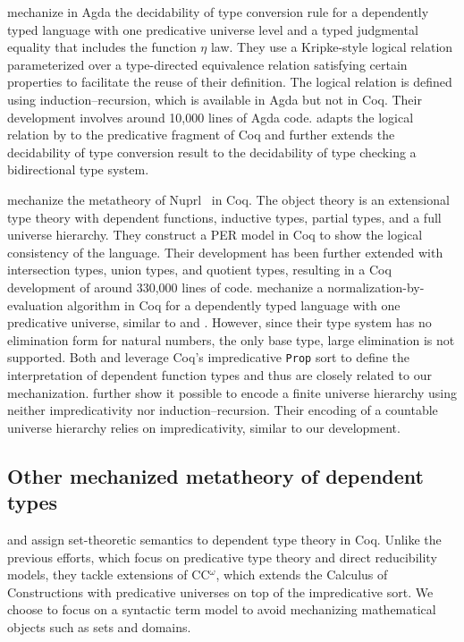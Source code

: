 \documentclass[\ifpublic nolinenum\else\fi,online,OA]{jfp}
\newcommand{\jc}[1]{}
\theoremstyle{definition}
\begin{document}
\citet{decagda} mechanize in Agda the decidability of type
conversion rule for a dependently typed language with one predicative
universe level and a typed judgmental equality that includes the function
$\eta$ law. They
use a Kripke-style logical relation parameterized over a
type-directed equivalence relation satisfying certain
properties to facilitate the reuse of their definition. The
logical relation is defined using induction--recursion,
which is available in Agda but not in Coq. Their development involves
around 10,000 lines of Agda code.
\citet{martin-lof-a-la-coq} adapts the logical relation
by \citet{decagda} to the predicative fragment of Coq and further
extends the decidability of type conversion result to the decidability of
type checking a bidirectional type system.

\citet{anand2014towards} mechanize the metatheory of
Nuprl~\citep{constable1986implementing} in Coq. The object theory is an
extensional type theory with dependent functions, inductive types,
partial types, and a full universe hierarchy. They construct a PER
model in Coq to show the logical consistency of the language. Their
development has been further extended with intersection types,
union types, and quotient types, resulting in a Coq development of around
330,000 lines of code.
\citet{nbeincoq} mechanize a normalization-by-evaluation algorithm in Coq for a
dependently typed language with one predicative universe, similar to
\citet{decagda} and \citet{martin-lof-a-la-coq}. However, since their
type system has no elimination form for natural numbers, the only base type,
large elimination is not supported.
Both \citet{anand2014towards} and \citet{nbeincoq} leverage
Coq's impredicative \texttt{Prop} sort to define the interpretation
of dependent function types and thus are closely related to our
mechanization. \citet{anand2014towards} further show it possible
to encode a finite universe hierarchy using neither impredicativity
nor induction--recursion. Their encoding of a countable
universe hierarchy relies on impredicativity, similar to our
development.
\jc{Wait I'm confused, do they use impredicativity or not?}

\subsection{Other mechanized metatheory of dependent types}

 and \citet{Wang2013SemanticsOI} assign
set-theoretic semantics to dependent type theory in Coq. Unlike the
previous efforts, which focus on predicative type theory and direct
reducibility models, they tackle extensions of
CC$^\omega$, which extends the Calculus of Constructions with predicative
universes on top of the impredicative sort. We choose to
focus on a syntactic term model to avoid mechanizing mathematical objects
such as sets and domains.
\end{document}
